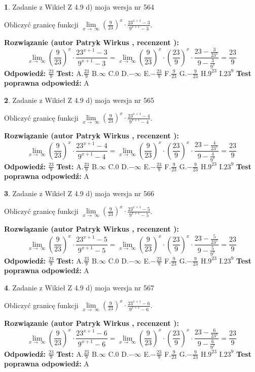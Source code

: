 \documentclass[12pt, a4paper]{article}
\theoremstyle{definition} %
\newtheorem{zad}{}
\newcommand{\zadStart}[1]{\begin{zad}#1\newline}
\newcommand{\zadStop}{\end{zad}}
\newcommand{\rozwStart}[2]{\noindent \textbf{Rozwiązanie (autor #1 , recenzent #2): }\newline}
\newcommand{\rozwStop}{\newline}
\newcommand{\odpStart}{\noindent \textbf{Odpowiedź:}\newline}
\newcommand{\odpStop}{\newline}
\newcommand{\testStart}{\noindent \textbf{Test:}\newline}
\newcommand{\testStop}{\newline}
\newcommand{\kluczStart}{\noindent \textbf{Test poprawna odpowiedź:}\newline}
\newcommand{\kluczStop}{\newline}
\begin{document}
\zadStart{Zadanie z Wikieł Z 4.9 d) moja wersja nr 564}


Obliczyć granicę funkcji  $\lim\limits_{x\to\ \infty}(\frac{9}{23})^{x}\cdot\frac{23^{x+1}-3}{9^{x+1}-3}$.
\zadStop
\rozwStart{Patryk Wirkus}{}
$$\lim\limits_{x\to\ \infty}(\frac{9}{23})^{x}\cdot\frac{23^{x+1}-3}{9^{x+1}-3}=\lim\limits_{x\to\ \infty}(\frac{9}{23})^{x}\cdot(\frac{23}{9})^{x} \cdot \frac{23-\frac{3}{23^{x}}}{9-\frac{3}{9^{x}}} = \frac{23}{9}$$
\rozwStop
\odpStart
$\frac{23}{9}$
\odpStop
\testStart
A.$\frac{23}{9}$ B.$\infty$ C.$0$ D.$-\infty$ E.$-\frac{23}{9}$
F.$\frac{9}{23}$ G.$-\frac{9}{23}$
H.$9^{23}$
I.$23^{9}$
\testStop
\kluczStart
A
\kluczStop



\zadStart{Zadanie z Wikieł Z 4.9 d) moja wersja nr 565}


Obliczyć granicę funkcji  $\lim\limits_{x\to\ \infty}(\frac{9}{23})^{x}\cdot\frac{23^{x+1}-4}{9^{x+1}-4}$.
\zadStop
\rozwStart{Patryk Wirkus}{}
$$\lim\limits_{x\to\ \infty}(\frac{9}{23})^{x}\cdot\frac{23^{x+1}-4}{9^{x+1}-4}=\lim\limits_{x\to\ \infty}(\frac{9}{23})^{x}\cdot(\frac{23}{9})^{x} \cdot \frac{23-\frac{4}{23^{x}}}{9-\frac{4}{9^{x}}} = \frac{23}{9}$$
\rozwStop
\odpStart
$\frac{23}{9}$
\odpStop
\testStart
A.$\frac{23}{9}$ B.$\infty$ C.$0$ D.$-\infty$ E.$-\frac{23}{9}$
F.$\frac{9}{23}$ G.$-\frac{9}{23}$
H.$9^{23}$
I.$23^{9}$
\testStop
\kluczStart
A
\kluczStop



\zadStart{Zadanie z Wikieł Z 4.9 d) moja wersja nr 566}


Obliczyć granicę funkcji  $\lim\limits_{x\to\ \infty}(\frac{9}{23})^{x}\cdot\frac{23^{x+1}-5}{9^{x+1}-5}$.
\zadStop
\rozwStart{Patryk Wirkus}{}
$$\lim\limits_{x\to\ \infty}(\frac{9}{23})^{x}\cdot\frac{23^{x+1}-5}{9^{x+1}-5}=\lim\limits_{x\to\ \infty}(\frac{9}{23})^{x}\cdot(\frac{23}{9})^{x} \cdot \frac{23-\frac{5}{23^{x}}}{9-\frac{5}{9^{x}}} = \frac{23}{9}$$
\rozwStop
\odpStart
$\frac{23}{9}$
\odpStop
\testStart
A.$\frac{23}{9}$ B.$\infty$ C.$0$ D.$-\infty$ E.$-\frac{23}{9}$
F.$\frac{9}{23}$ G.$-\frac{9}{23}$
H.$9^{23}$
I.$23^{9}$
\testStop
\kluczStart
A
\kluczStop



\zadStart{Zadanie z Wikieł Z 4.9 d) moja wersja nr 567}


Obliczyć granicę funkcji  $\lim\limits_{x\to\ \infty}(\frac{9}{23})^{x}\cdot\frac{23^{x+1}-6}{9^{x+1}-6}$.
\zadStop
\rozwStart{Patryk Wirkus}{}
$$\lim\limits_{x\to\ \infty}(\frac{9}{23})^{x}\cdot\frac{23^{x+1}-6}{9^{x+1}-6}=\lim\limits_{x\to\ \infty}(\frac{9}{23})^{x}\cdot(\frac{23}{9})^{x} \cdot \frac{23-\frac{6}{23^{x}}}{9-\frac{6}{9^{x}}} = \frac{23}{9}$$
\rozwStop
\odpStart
$\frac{23}{9}$
\odpStop
\testStart
A.$\frac{23}{9}$ B.$\infty$ C.$0$ D.$-\infty$ E.$-\frac{23}{9}$
F.$\frac{9}{23}$ G.$-\frac{9}{23}$
H.$9^{23}$
I.$23^{9}$
\testStop
\kluczStart
A
\kluczStop
\end{document}
